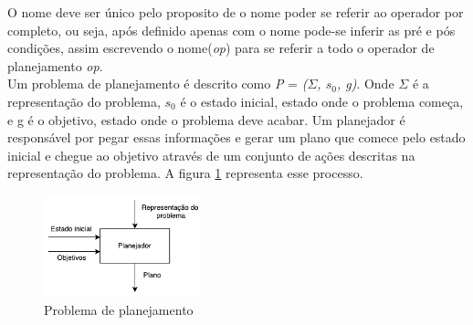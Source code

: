 O nome deve ser único pelo proposito de o nome poder se referir ao operador por completo, ou seja, após definido apenas com o nome pode-se inferir as pré e pós condições, assim escrevendo o nome(\textit{op}) para se referir a todo o operador de planejamento \textit{op}. \\

Um problema de planejamento é descrito como \textit{P} = \textit{($\Sigma$, $s_{0}$, g)}. Onde $\Sigma$ é a representação do problema, $s_{0}$ é o estado inicial, estado onde o problema começa, e g é o objetivo, estado onde o problema deve acabar. Um planejador é responsável por pegar essas informações e gerar um plano que comece pelo estado inicial e chegue ao objetivo através de um conjunto de ações descritas na representação do problema. A figura \ref{fig:planmodelo} representa esse processo.

\begin{figure}[ht]
	\centering
	\includegraphics[width=0.4\textwidth]{fig/modelo.pdf}
	\caption{Problema de planejamento}
	\label{fig:planmodelo}
\end{figure} 






